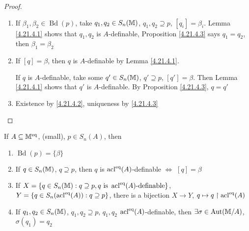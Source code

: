 \documentclass[11pt]{article}
\DeclareMathOperator{\Bd}{Bd}
\begin{document}
\begin{proof}
\begin{enumerate}
\item If \(\beta_1,\beta_2\in\Bd(p)\), take \(q_1,q_2\in S_n(\mathbb{M})\), \(q_1,q_2\supseteq p\), \([q_i]=\beta_i\). Lemma \ref{4.21.4.1}
shows that \(q_1,q_2\) is \(A\)-definable, Proposition \ref{4.21.4.3} says \(q_1=q_2\), then \(\beta_1=\beta_2\)
\item If \([q]=\beta\), then \(q\) is \(A\)-definable by Lemma \ref{4.21.4.1}.

If \(q\) is \(A\)-definable, take
some \(q'\in S_n(\mathbb{M})\), \(q'\supseteq p\), \([q']=\beta\). Then Lemma \ref{4.21.4.1} shows that \(q'\)
is \(A\)-definable. By Proposition \ref{4.21.4.3}, \(q=q'\)
\item Existence by \ref{4.21.4.2}, uniqueness by \ref{4.21.4.3}
\end{enumerate}
\end{proof}

\begin{theorem}
\label{4.21.4.5}
If \(A\subseteq\mathbb{M}^{\operatorname{eq}}\), (small), \(p\in S_n(A)\), then
\begin{enumerate}
\item \(\Bd(p)=\{\beta\}\)
\item If \(q\in S_n(\mathbb{M})\), \(q\supseteq p\), then \(q\) is \(\operatorname{acl}^{\operatorname{eq}}(A)\)-definable \(\Leftrightarrow\) \([q]=\beta\)
\item If \(X=\{q\in S_n(\mathbb{M}):q\supseteq p,q\text{ is }\operatorname{acl}^{\operatorname{eq}}(A)\text{-definable}\}\),
\(Y=\{q\in S_n(\operatorname{acl}^{\operatorname{eq}}(A)):q\supseteq p\}\), there is a bijection \(X\to Y\), \(q\mapsto q\upharpoonright\operatorname{acl}^{\operatorname{eq}}(A)\)
\item If \(q_1,q_2\in S_n(\mathbb{M})\), \(q_1,q_2\supseteq p\), \(q_1,q_2\) \(\operatorname{acl}^{\operatorname{eq}}(A)\)-definable,
then \(\exists \sigma\in\operatorname{\text{Aut}}(\mathbb{M}/A)\), \(\sigma(q_1)=q_2\)
\end{enumerate}
\end{theorem}
\end{document}
